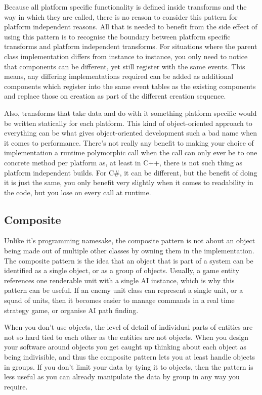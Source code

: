 Because all platform specific functionality is defined inside transforms and
the way in which they are called, there is no reason to consider this pattern
for platform independent reasons. All that is needed to benefit from the side
effect of using this pattern is to recognise the boundary between platform
specific transforms and platform independent transforms. For situations where
the parent class implementation differs from instance to instance, you only
need to notice that components can be different, yet still register with the
same events. This means, any differing implementations required can be added as
additional components which register into the same event tables as the existing
components and replace those on creation as part of the different creation
sequence.

Also, transforms that take data and do with it something platform specific
would be written statically for each platform. This kind of object-oriented
approach to everything can be what gives object-oriented development such a bad
name when it comes to performance. There's not really any benefit to making
your choice of implementation a runtime polymorphic call when the call can only
ever be to one concrete method per platform as, at least in C++, there is not
such thing as platform independent builds. For C\#, it can be different, but
the benefit of doing it is just the same, you only benefit very slightly when
it comes to readability in the code, but you lose on every call at runtime.

\subsection{Composite}

Unlike it's programming namesake, the composite pattern is not about an object
being made out of multiple other classes by owning them in the implementation.
The composite pattern is the idea that an object that is part of a system can
be identified as a single object, or as a group of objects. Usually, a game
entity references one renderable unit with a single AI instance, which is why
this pattern can be useful. If an enemy unit class can represent a single unit,
or a squad of units, then it becomes easier to manage commands in a real time
strategy game, or organise AI path finding.

When you don't use objects, the level of detail of individual parts of entities
are not so hard tied to each other as the entities are not objects. When you
design your software around objects you get caught up thinking about each
object as being indivisible, and thus the composite pattern lets you at least
handle objects in groups. If you don't limit your data by tying it to objects,
then the pattern is less useful as you can already manipulate the data by group
in any way you require.

